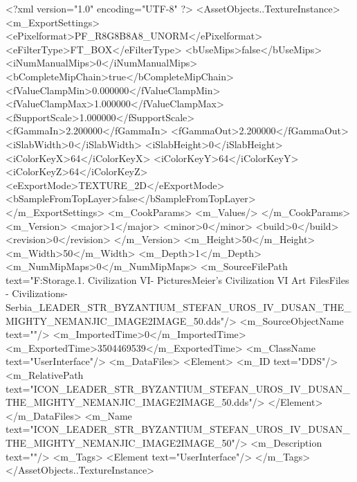 <?xml version="1.0" encoding="UTF-8" ?>
<AssetObjects..TextureInstance>
	<m_ExportSettings>
		<ePixelformat>PF_R8G8B8A8_UNORM</ePixelformat>
		<eFilterType>FT_BOX</eFilterType>
		<bUseMips>false</bUseMips>
		<iNumManualMips>0</iNumManualMips>
		<bCompleteMipChain>true</bCompleteMipChain>
		<fValueClampMin>0.000000</fValueClampMin>
		<fValueClampMax>1.000000</fValueClampMax>
		<fSupportScale>1.000000</fSupportScale>
		<fGammaIn>2.200000</fGammaIn>
		<fGammaOut>2.200000</fGammaOut>
		<iSlabWidth>0</iSlabWidth>
		<iSlabHeight>0</iSlabHeight>
		<iColorKeyX>64</iColorKeyX>
		<iColorKeyY>64</iColorKeyY>
		<iColorKeyZ>64</iColorKeyZ>
		<eExportMode>TEXTURE_2D</eExportMode>
		<bSampleFromTopLayer>false</bSampleFromTopLayer>
	</m_ExportSettings>
	<m_CookParams>
		<m_Values/>
	</m_CookParams>
	<m_Version>
		<major>1</major>
		<minor>0</minor>
		<build>0</build>
		<revision>0</revision>
	</m_Version>
	<m_Height>50</m_Height>
	<m_Width>50</m_Width>
	<m_Depth>1</m_Depth>
	<m_NumMipMaps>0</m_NumMipMaps>
	<m_SourceFilePath text="F:\Mod Storage\2.1. Civilization VI\Mods\Archive - Pictures\Sid Meier's Civilization VI Art Files\Art Files - Civilizations\Civilization - Serbia\ICON_LEADER_STR_BYZANTIUM_STEFAN_UROS_IV_DUSAN_THE_MIGHTY_NEMANJIC_IMAGE2IMAGE_50.dds"/>
	<m_SourceObjectName text=""/>
	<m_ImportedTime>0</m_ImportedTime>
	<m_ExportedTime>3504469539</m_ExportedTime>
	<m_ClassName text="UserInterface"/>
	<m_DataFiles>
		<Element>
			<m_ID text="DDS"/>
			<m_RelativePath text="ICON_LEADER_STR_BYZANTIUM_STEFAN_UROS_IV_DUSAN_THE_MIGHTY_NEMANJIC_IMAGE2IMAGE_50.dds"/>
		</Element>
	</m_DataFiles>
	<m_Name text="ICON_LEADER_STR_BYZANTIUM_STEFAN_UROS_IV_DUSAN_THE_MIGHTY_NEMANJIC_IMAGE2IMAGE_50"/>
	<m_Description text=""/>
	<m_Tags>
		<Element text="UserInterface"/>
	</m_Tags>
</AssetObjects..TextureInstance>


